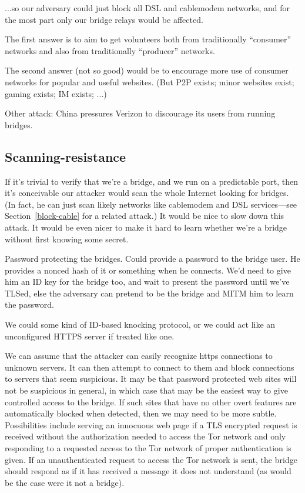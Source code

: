 \documentclass{llncs}
\begin{document}
...so our adversary could just block all DSL and cablemodem networks,
and for the most part only our bridge relays would be affected.

The first answer is to aim to get volunteers both from traditionally
``consumer'' networks and also from traditionally ``producer'' networks.

The second answer (not so good) would be to encourage more use of consumer
networks for popular and useful websites.  (But P2P exists; minor websites
exist; gaming exists; IM exists; ...)

Other attack: China pressures Verizon to discourage its users from
running bridges.

\subsection{Scanning-resistance}

If it's trivial to verify that we're a bridge, and we run on a predictable
port, then it's conceivable our attacker would scan the whole Internet
looking for bridges. (In fact, he can just scan likely networks like
cablemodem and DSL services---see Section~\ref{block-cable} for a related
attack.) It would be nice to slow down this attack. It would
be even nicer to make it hard to learn whether we're a bridge without
first knowing some secret.

Password protecting the bridges.
Could provide a password to the bridge user. He provides a nonced hash of
it or something when he connects. We'd need to give him an ID key for the
bridge too, and wait to present the password until we've TLSed, else the
adversary can pretend to be the bridge and MITM him to learn the password.

We could some kind of ID-based knocking protocol, or we could act like an
unconfigured HTTPS server if treated like one.

We can assume that the attacker can easily recognize https connections
to unknown servers. It can then attempt to connect to them and block
connections to servers that seem suspicious. It may be that password
protected web sites will not be suspicious in general, in which case
that may be the easiest way to give controlled access to the bridge.
If such sites that have no other overt features are automatically
blocked when detected, then we may need to be more subtle.
Possibilities include serving an innocuous web page if a TLS encrypted
request is received without the authorization needed to access the Tor
network and only responding to a requested access to the Tor network
of proper authentication is given. If an unauthenticated request to
access the Tor network is sent, the bridge should respond as if
it has received a message it does not understand (as would be the
case were it not a bridge).
\end{document}
